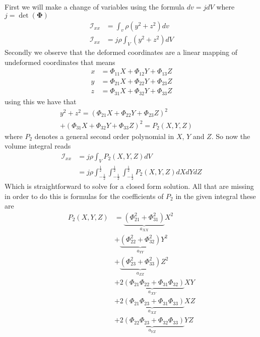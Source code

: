 \documentclass[twocolumn]{article}
\newcommand{\mat}[1]{\ensuremath{\mathbf{#1} }}
\newcommand{\inertia}{\ensuremath{\mathcal{I} }}
\begin{document}
First we will make a change of variables using the formula $dv = j dV$ where $j
= \det(\mat  \Phi)$
\begin{subequations}
  \begin{align*}
    \inertia_{xx} &= \int_v  \rho \left( y^2 + z^2 \right)  dv \\
    \inertia_{xx} &= j \rho \int_V   \left( y^2 + z^2 \right)  dV
  \end{align*}  
\end{subequations}
Secondly we observe that the deformed coordinates are a linear mapping of
undeformed coordinates that means
\begin{subequations}
  \begin{align*}
    x  &=  \Phi_{11} X + \Phi_{12} Y + \Phi_{13} Z\\
    y  &=  \Phi_{21} X + \Phi_{22} Y + \Phi_{23} Z\\
    z  &=  \Phi_{31} X + \Phi_{32} Y + \Phi_{33} Z
  \end{align*}
\end{subequations}
using this we have that
\begin{equation*}
  \begin{split}
    y^2 + z^2 
    =
    \left(\Phi_{21} X + \Phi_{22} Y + \Phi_{23} Z\right)^2 
    \quad \quad \quad \quad \quad 
    \\
    +
    \left(\Phi_{31} X + \Phi_{32} Y    + \Phi_{33} Z\right)^2 
    =
    P_2(X,Y,Z)    
  \end{split}
\end{equation*}
where $P_2$ denotes a general second order polynomial in $X$, $Y$ and $Z$. So
now the volume integral reads
\begin{subequations}
  \begin{align*}
    \inertia_{xx} 
    &=
    j \rho \int_V   P_2(X,Y,Z)  dV\\
    &= 
    j \rho 
    \int_{-\frac{1}{2}}^{\frac{1}{2}}  
    \int_{-\frac{1}{2}}^{\frac{1}{2}}  
    \int_{-\frac{1}{2}}^{\frac{1}{2}}  
    P_2(X,Y,Z)
    dX
    dY
    dZ
  \end{align*}
\end{subequations}
Which is straightforward to solve for a closed form solution. All that are
missing in order to do this is formulas for the coefficients of $P_2$ in the
given integral these are
\begin{subequations}
  \begin{align*}
    P_2(X,Y,Z) 
    &= \underbrace{ \left (\Phi_{21}^2 + \Phi_{31}^2\right) }_{a_{XX}} X^2 \\
    &+ \underbrace{ \left (\Phi_{22}^2 + \Phi_{32}^2\right) }_{a_{YY}}  Y^2 \\
    &+ \underbrace{ \left (\Phi_{23}^2 + \Phi_{33}^2\right) }_{a_{ZZ}}  Z^2\\
    &+ \underbrace{ 2 \left ( \Phi_{21} \Phi_{22} + \Phi_{31} \Phi_{32} \right)
    }_{a_{XY}}  X Y \\
    &+ \underbrace{ 2 \left ( \Phi_{21} \Phi_{23} + \Phi_{31} \Phi_{33} \right)
    }_{a_{XZ}}  X Z \\
    &+ \underbrace{ 2 \left(\Phi_{22} \Phi_{23} + \Phi_{32} \Phi_{33}\right) }_{a_{YZ}} Y Z 
  \end{align*}
\end{subequations}
\end{document}
